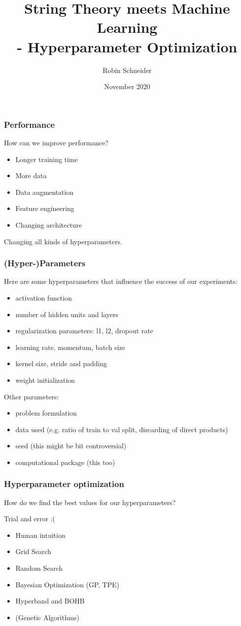 \documentclass{beamer}
\title[Hyperparameter Optimization]{String Theory meets Machine Learning\\
	- Hyperparameter Optimization}
\author{Robin Schneider}
\institute{Uppsala University}
\date{November 2020}
\newcommand{\bi}{\begin{itemize}}
\newcommand{\ei}{\end{itemize}}
\begin{document}
	
\frame{\titlepage}

\begin{frame}
\frametitle{Performance}
How can we improve performance? \pause
\bi
\item Longer training time
\item More data
\item Data augmentation
\item Feature engineering
\item Changing architecture
\ei
\pause 
Changing all kinds of hyperparameters.
\end{frame}

\begin{frame}
\frametitle{(Hyper-)Parameters}
Here are some hyperparameters that influence the success of our experiments: \pause 
\bi
\item activation function
\item number of hidden units and layers
\item regularization parameters: l1, l2, dropout rate
\item learning rate, momentum, batch size 
\item kernel size, stride and padding
\item weight initialization
\ei
\pause Other parameters:
\bi
\item problem formulation
\item data used (e.g. ratio of train to val split, discarding of direct products)
\item seed (this might be bit controversial)
\item computational package (this too)
\ei
\end{frame}

\begin{frame}
\frametitle{Hyperparameter optimization}
How do we find the best values for our hyperparameters?
\pause 

Trial and error :(
\pause 
\bi
\item Human intuition
\item Grid Search
\item Random Search
\item Bayesian Optimization (GP, TPE)
\item Hyperband and BOHB
\item (Genetic Algorithms)
\ei
\end{frame}
\end{document}
